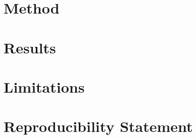 \documentclass{article}
\begin{document}
\section{Method}

\section{Results}

\section{Limitations}

\section{Reproducibility Statement}

% 
% 
\end{document}
